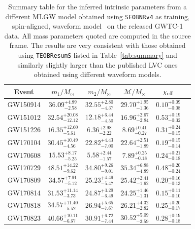 \iffalse
\begin{table}[t]
\centering
\caption{Summary table for the inferred intrinsic parameters from a different MLGW model obtained using  {\tt SEOBNRv4} as training,
spin-aligned, waveform model~\cite{Bohe:2016gbl} on the released GWTC-1 data. All mass parameters quoted are computed in the 
source frame. The results are very consistent with those obtained using {\tt TEOBResumS} listed in Table~\ref{tab:summary} and similarly
slightly larger than the published LVC ones obtained using different waveform models.
} 
\label{tab:summary_seob}
\begin{ruledtabular}

\begin{tabular}{cccccc}
Event    & $m_1/M_\odot$ & $m_2/M_\odot$ & $\mathcal{M}/M_\odot$ & $\chi_{\rm eff}$ \\ \hline
\vspace{1.0 mm}
GW150914& $36.09_{-2.58}^{+4.89}$& $32.55_{-4.37}^{+2.80}$& $29.70_{-1.36}^{+1.95}$& $0.10_{-0.08}^{+0.09}$ \\
\vspace{1.0 mm}
GW151012& $32.54_{-12.12}^{+20.08}$& $12.18_{-4.50}^{+6.44}$& $16.96_{-2.84}^{+2.67}$& $0.53_{-0.32}^{+0.19}$\\
\vspace{1.0 mm}
GW151226& $16.35_{-5.61}^{+12.60}$& $6.36_{-2.22}^{+2.98}$& $8.69_{-0.27}^{+0.41}$& $0.31_{-0.15}^{+0.24}$\\
\vspace{1.0 mm}
GW170104& $30.45_{-4.56}^{+10.49}$& $22.82_{-7.00}^{+4.43}$& $22.64_{-1.89}^{+2.51}$& $0.19_{-0.14}^{+0.15}$\\
\vspace{1.0 mm}
GW170608& $15.53_{-5.25}^{+8.17}$& $5.58_{-1.57}^{+2.44}$& $7.89_{-0.18}^{+0.25}$& $0.24_{-0.18}^{+0.21}$\\
\vspace{1.0 mm}
GW170729& $48.51_{-9.62}^{+14.22}$& $34.80_{-9.01}^{+9.26}$& $35.34_{-4.89}^{+6.88}$& $0.48_{-0.24}^{+0.20}$\\
\vspace{1.0 mm}
GW170809& $34.57_{-5.12}^{+7.91}$& $25.23_{-5.47}^{+4.49}$& $25.42_{-1.62}^{+2.41}$& $0.20_{-0.13}^{+0.16}$\\
\vspace{1.0 mm}
GW170814& $31.53_{-3.73}^{+11.14}$& $24.87_{-6.49}^{+3.29}$& $24.25_{-1.31}^{+1.46}$& $0.15_{-0.10}^{+0.11}$\\
\vspace{1.0 mm}
GW170818& $34.57_{-5.52}^{+11.40}$& $26.94_{-7.67}^{+5.65}$& $26.21_{-2.82}^{+4.32}$& $0.25_{-0.17}^{+0.20}$\\
\vspace{1.0 mm}
GW170823& $40.66_{-6.67}^{+10.11}$& $30.91_{-7.44}^{+6.72}$& $30.52_{-3.59}^{+5.09}$& $0.28_{-0.18}^{+0.19}$\\
\end{tabular}


\end{ruledtabular}
\end{table}
